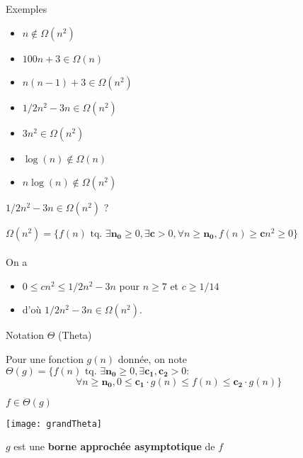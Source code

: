 \begin{frame}{Exemples}
    \begin{itemize}
  \item $n \notin \Omega(n^2)$
  \item $100n+3 \in \Omega(n)$
  \item $n(n-1) + 3 \in \Omega(n^2)$
  \item $1/2n^2 -3n \in \Omega(n^2)$
  \item $3n^2 \in \Omega(n^2)$
  \item $\log(n) \notin \Omega(n)$
  \item $n\log(n) \notin \Omega(n^2)$
  \end{itemize}
\end{frame}
  
\begin{frame}{$1/2n^2 -3n \in \Omega(n^2)$ ?}

$\Omega(n^2) = \{f(n) \mbox{ tq. } \exists \mathbf{n_0} \geq 0, \exists
\mathbf{c} > 0, \forall n \geq \mathbf{n_0}, f(n) \geq \mathbf{c}n^2 \geq 0\}$
~\\
~\\
On a
\begin{itemize}
\item  $0 \leq cn^2 \leq 1/2n^2 -3n$ pour $n \geq 7$ et $c \geq 1/14$
\item d'où $1/2 n^2 -3n \in \Omega(n^2)$. 
\end{itemize}
\end{frame}

\begin{frame}{Notation $\Theta$ (Theta)}
  \begin{definition}
Pour une fonction $g(n)$ donnée, on note 
$\Theta(g) = \{f(n) \mbox{ tq. } \exists \mathbf{n_0} \geq 0, \exists
    \mathbf{c_1},\mathbf{c_2} > 0:$ \\
     $~~~~~~~~~~~~~~~~~~~~~~~~~~~~~~~~\forall n \geq \mathbf{n_0}, 0 \leq
     \mathbf{c_1}\cdot{} g(n) \leq f(n) \leq \mathbf{c_2}\cdot{}g(n)\}$
\end{definition}
\end{frame}

\begin{frame}{$f \in \Theta(g)$}

\texttt{[image: grandTheta]}  

$g$  est une \textbf{borne approchée asymptotique} de $f$
\end{frame}


